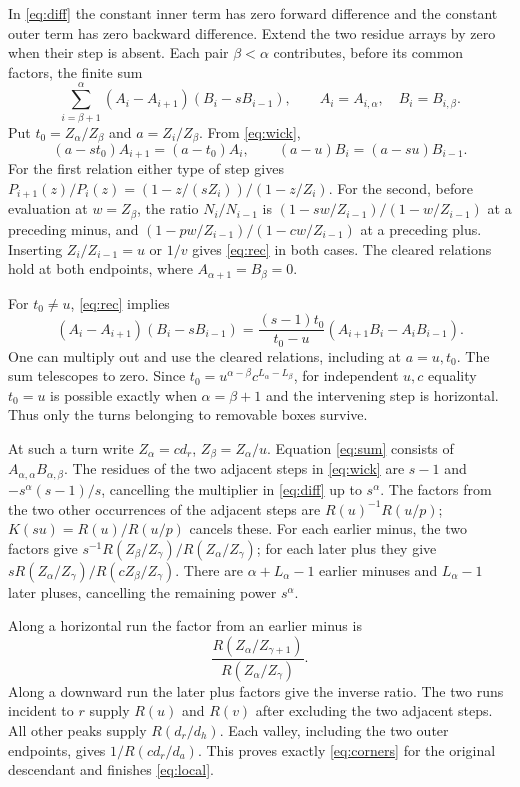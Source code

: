 In \eqref{eq:diff} the constant inner term has zero forward difference and the constant outer term has zero backward difference. Extend the two residue arrays by zero when their step is absent. Each pair \(\beta<\alpha\) contributes, before its common factors, the finite sum
\begin{equation}
\sum_{i=\beta+1}^{\alpha}(A_i-A_{i+1})(B_i-sB_{i-1}),
 \qquad A_i=A_{i,\alpha},\quad B_i=B_{i,\beta}.
 \label{eq:sum}
\end{equation}
Put \(t_0=Z_\alpha/Z_\beta\) and \(a=Z_i/Z_\beta\). From \eqref{eq:wick},
\begin{equation}
(a-st_0)A_{i+1}=(a-t_0)A_i,\qquad
 (a-u)B_i=(a-su)B_{i-1}.
 \label{eq:rec}
\end{equation}
For the first relation either type of step gives \(P_{i+1}(z)/P_i(z)=(1-z/(sZ_i))/(1-z/Z_i)\). For the second, before evaluation at \(w=Z_\beta\), the ratio \(N_i/N_{i-1}\) is \((1-sw/Z_{i-1})/(1-w/Z_{i-1})\) at a preceding minus, and \((1-pw/Z_{i-1})/(1-cw/Z_{i-1})\) at a preceding plus. Inserting \(Z_i/Z_{i-1}=u\) or \(1/v\) gives \eqref{eq:rec} in both cases. The cleared relations hold at both endpoints, where \(A_{\alpha+1}=B_\beta=0\).

For \(t_0\ne u\), \eqref{eq:rec} implies
\begin{equation}
(A_i-A_{i+1})(B_i-sB_{i-1})
 =\frac{(s-1)t_0}{t_0-u}
       (A_{i+1}B_i-A_iB_{i-1}).
 \label{eq:tel}
\end{equation}
One can multiply out and use the cleared relations, including at \(a=u,t_0\). The sum telescopes to zero. Since \(t_0=u^{\alpha-\beta}c^{L_\alpha-L_\beta}\), for independent \(u,c\) equality \(t_0=u\) is possible exactly when \(\alpha=\beta+1\) and the intervening step is horizontal. Thus only the turns belonging to removable boxes survive.

At such a turn write \(Z_\alpha=c d_r\), \(Z_\beta=Z_\alpha/u\). Equation \eqref{eq:sum} consists of \(A_{\alpha,\alpha}B_{\alpha,\beta}\). The residues of the two adjacent steps in \eqref{eq:wick} are \(s-1\) and \(-s^\alpha(s-1)/s\), cancelling the multiplier in \eqref{eq:diff} up to \(s^\alpha\). The factors from the two other occurrences of the adjacent steps are \(R(u)^{-1}R(u/p)\); \(K(su)=R(u)/R(u/p)\) cancels these. For each earlier minus, the two factors give \(s^{-1}R(Z_\beta/Z_\gamma)/R(Z_\alpha/Z_\gamma)\); for each later plus they give \(sR(Z_\alpha/Z_\gamma)/R(cZ_\beta/Z_\gamma)\). There are \(\alpha+L_\alpha-1\) earlier minuses and \(L_\alpha-1\) later pluses, cancelling the remaining power \(s^\alpha\).

Along a horizontal run the factor from an earlier minus is
\[
 \frac{R(Z_\alpha/Z_{\gamma+1})}{R(Z_\alpha/Z_\gamma)} .
\]
Along a downward run the later plus factors give the inverse ratio. The two runs incident to \(r\) supply \(R(u)\) and \(R(v)\) after excluding the two adjacent steps. All other peaks supply \(R(d_r/d_h)\). Each valley, including the two outer endpoints, gives \(1/R(c d_r/d_a)\). This proves exactly \eqref{eq:corners} for the original descendant and finishes \eqref{eq:local}.
